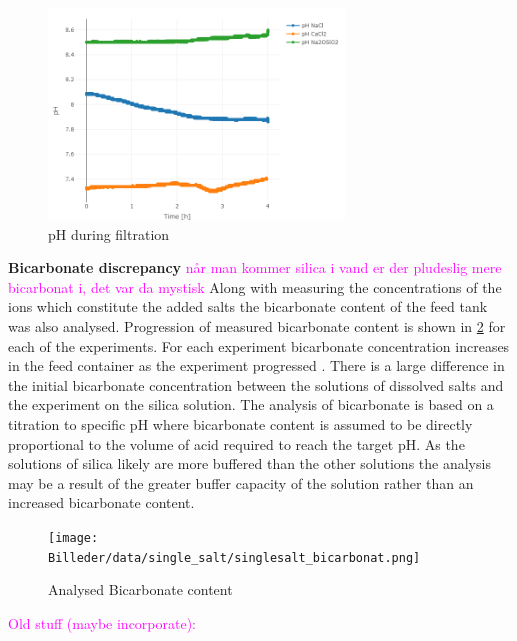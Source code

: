 \begin{figure}[htbp]
    \centering
    \includegraphics[width=0.7\textwidth]{Billeder/data/single_salt/singlesalt_pH.png}
    \caption{pH during filtration }
    \label{fig:single_salt_pH}
\end{figure}

\textbf{Bicarbonate discrepancy}
\textcolor{magenta}{når man kommer silica i vand er der pludeslig mere bicarbonat i, det var da mystisk}
Along with measuring the concentrations of the ions which constitute the added salts the bicarbonate content of the feed tank was also analysed. 
Progression of measured bicarbonate content is shown in \cref{fig:single_salt_bicarbonate} for each of the experiments.
For each experiment bicarbonate concentration increases in the feed container as the experiment progressed .
There is a large difference in the initial bicarbonate concentration between the solutions of dissolved salts and the experiment on the silica solution.
The analysis of bicarbonate is based on a titration to specific pH where bicarbonate content is assumed to be directly proportional to the volume of acid required to reach the target pH.
As the solutions of silica likely are more buffered than the other solutions the analysis may be a result of the greater buffer capacity of the solution rather than an increased bicarbonate content.  




\begin{figure}[htbp]
    \centering
    \texttt{[image: Billeder/data/single\_salt/singlesalt\_bicarbonat.png]}
    \caption{Analysed Bicarbonate content}
    \label{fig:single_salt_bicarbonate}
\end{figure}





\textcolor{magenta}{Old stuff (maybe incorporate):}

